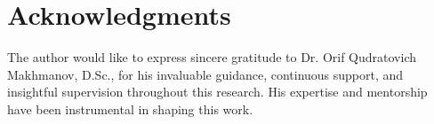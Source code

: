 \documentclass[pdflatex,sn-mathphys-num]{sn-jnl}%
\theoremstyle{thmstyleone}%
\theoremstyle{thmstyletwo}%
\theoremstyle{thmstylethree}%
\begin{document}

\section*{Acknowledgments}

The author would like to express sincere gratitude to Dr. Orif Qudratovich Makhmanov, D.Sc., for his invaluable guidance, continuous support, and insightful supervision throughout this research. His expertise and mentorship have been instrumental in shaping this work.


\end{document}
